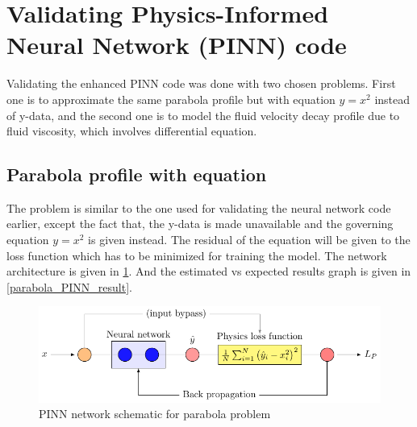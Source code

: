 \section{Validating Physics-Informed Neural Network (PINN) code}
\par{}
Validating the enhanced PINN code was done with two chosen problems. First one
is to approximate the same parabola profile but with equation \(y=x^2\) instead
of y-data, and the second one is to model the fluid velocity decay profile due
to fluid viscosity, which involves differential equation. \\

\subsection{Parabola profile with equation}
\par{}
The problem is similar to the one used for validating the neural network code
earlier, except the fact that, the y-data is made unavailable and the
governing equation \(y=x^2\) is given instead. The residual of the equation
will be given to the loss function which has to be minimized for training the
model. The network architecture is given in \cref{parabola_PINN_network}.
And the estimated vs expected results graph is given in \cref{parabola_PINN_result}.\\

\begin{figure}
   \center
    \includegraphics[scale=1]{supportingFiles/01_schematics/04_parabola_PINN_network/parabola_PINN.pdf}
    \caption{PINN network schematic for parabola problem}
    \label{parabola_PINN_network}
\end{figure}

